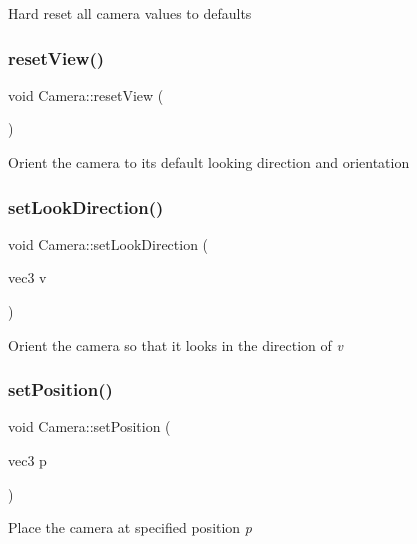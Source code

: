 Hard reset all camera values to defaults \mbox{\label{classCamera_ad7e8f779ab27268fe301c3e4db4187a5}} 
\subsubsection{\texorpdfstring{reset\+View()}{resetView()}}
{\footnotesize\ttfamily void Camera\+::reset\+View (\begin{DoxyParamCaption}{ }\end{DoxyParamCaption})}

Orient the camera to it\textquotesingle{}s default looking direction and orientation \mbox{\label{classCamera_ab714eaa26dcdf34a9de4b8aef36b3809}} 
\subsubsection{\texorpdfstring{set\+Look\+Direction()}{setLookDirection()}}
{\footnotesize\ttfamily void Camera\+::set\+Look\+Direction (\begin{DoxyParamCaption}\item[{vec3}]{v }\end{DoxyParamCaption})}

Orient the camera so that it looks in the direction of {\itshape v} {\itshape } \mbox{\label{classCamera_af00b6bee171d6d24893784589f5fb977}} 
\subsubsection{\texorpdfstring{set\+Position()}{setPosition()}}
{\footnotesize\ttfamily void Camera\+::set\+Position (\begin{DoxyParamCaption}\item[{vec3}]{p }\end{DoxyParamCaption})}

Place the camera at specified position {\itshape p} {\itshape } \mbox{\label{classCamera_a9d7b1b2a24086391c13cbdb102564580}} 
